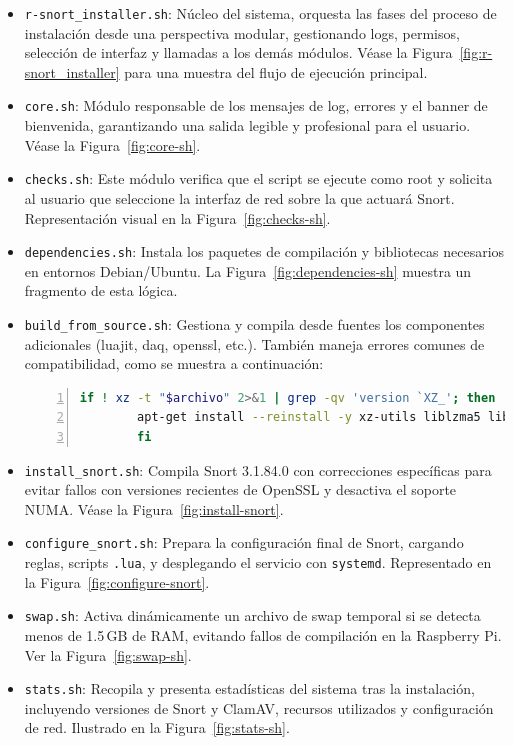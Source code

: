 \documentclass[11pt,a4paper,twoside]{report}
\begin{document}
\begin{itemize}
	\item \texttt{r-snort\_installer.sh}: Núcleo del sistema, orquesta las fases del proceso de instalación desde una perspectiva modular, gestionando logs, permisos, selección de interfaz y llamadas a los demás módulos.  
	Véase la Figura~\ref{fig:r-snort_installer} para una muestra del flujo de ejecución principal.
	
	\item \texttt{core.sh}: Módulo responsable de los mensajes de log, errores y el banner de bienvenida, garantizando una salida legible y profesional para el usuario.  
	Véase la Figura~\ref{fig:core-sh}.
	
	\item \texttt{checks.sh}: Este módulo verifica que el script se ejecute como root y solicita al usuario que seleccione la interfaz de red sobre la que actuará Snort.  
	Representación visual en la Figura~\ref{fig:checks-sh}.
	
	\item \texttt{dependencies.sh}: Instala los paquetes de compilación y bibliotecas necesarios en entornos Debian/Ubuntu.  
	La Figura~\ref{fig:dependencies-sh} muestra un fragmento de esta lógica.
	
	\item \texttt{build\_from\_source.sh}: Gestiona y compila desde fuentes los componentes adicionales (luajit, daq, openssl, etc.).  
	También maneja errores comunes de compatibilidad, como se muestra a continuación:
	
	\begin{lstlisting}[language=bash, caption={Corrección de versiones incompatibles de xz/liblzma}, label=lst:xz, basicstyle=\ttfamily\footnotesize, frame=single, numbers=left, numberstyle=\tiny, breaklines=true]
		if ! xz -t "$archivo" 2>&1 | grep -qv 'version `XZ_'; then
		apt-get install --reinstall -y xz-utils liblzma5 liblzma-dev
		fi
	\end{lstlisting}
	
	\item \texttt{install\_snort.sh}: Compila Snort 3.1.84.0 con correcciones específicas para evitar fallos con versiones recientes de OpenSSL y desactiva el soporte NUMA.  
	Véase la Figura~\ref{fig:install-snort}.
	
	\item \texttt{configure\_snort.sh}: Prepara la configuración final de Snort, cargando reglas, scripts \texttt{.lua}, y desplegando el servicio con \texttt{systemd}.  
	Representado en la Figura~\ref{fig:configure-snort}.
	
	\item \texttt{swap.sh}: Activa dinámicamente un archivo de swap temporal si se detecta menos de 1.5\,GB de RAM, evitando fallos de compilación en la Raspberry Pi.  
	Ver la Figura~\ref{fig:swap-sh}.
	
	\item \texttt{stats.sh}: Recopila y presenta estadísticas del sistema tras la instalación, incluyendo versiones de Snort y ClamAV, recursos utilizados y configuración de red.  
	Ilustrado en la Figura~\ref{fig:stats-sh}.
\end{itemize}
\end{document}
